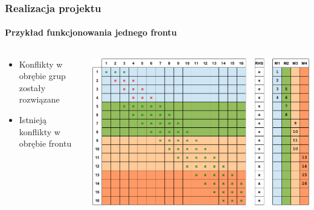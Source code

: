 \documentclass{beamer}
\begin{document}
\begin{frame}
\frametitle{Realizacja projektu}
\framesubtitle{Przykład funkcjonowania jednego frontu}
\begin{columns}[t] %
     \begin{column}[T]{5cm} %
     \begin{itemize}
		\item Konflikty w obrębie grup zostały rozwiązane
		\item\alert Istnieją konflikty w obrębie frontu
     \end{itemize}
     \end{column}
     \begin{column}[T]{7cm} %
		\includegraphics[scale=0.3]{frame1.jpg}
     \end{column}
     \end{columns}
\end{frame}
\end{document}
